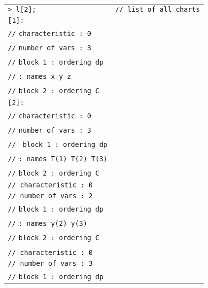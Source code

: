 \documentclass{article}
\begin{document}
\begin{table}[htbp]
	\begin{tabular}{ll}

		\texttt{> l[2];  } &   \texttt{// list of all charts} \\
		\texttt{[1]:}  &   \\
		\texttt{//}   \texttt{characteristic : 0}  &   \\
		\texttt{//}    \texttt{number of vars : 3}  &   \\
		\texttt{//}    \hspace*{1.2cm}   \texttt{block   1 : ordering dp}  &   \\
		\texttt{//}      \hspace*{2.7cm}   \texttt{: names    x y z}  &   \\
		\texttt{//}      \hspace*{1.2cm}    \texttt{block   2 : ordering C}  &   \\
		\texttt{[2]:}  &   \\
		\texttt{//}    \texttt{characteristic : 0}  &   \\
		\texttt{//}    \texttt{number of vars : 3}  &   \\
		\texttt{//}     \hspace*{1cm}    \texttt{ block   1 : ordering dp}  &   \\
		\texttt{//}      \hspace*{2.7cm} \texttt{: names    T(1) T(2) T(3)}  &   \\
		\texttt{//}    \hspace*{1.2cm}      \texttt{block   2 : ordering C}  &   \\
		\texttt{// characteristic : 0}         &  \\
		\texttt{// number of vars : 2}  &   \\
		\texttt{//} \hspace*{1.2cm} \texttt{block   1 : ordering dp}  &   \\
		\texttt{//} \hspace*{2.7cm}  \texttt{: names    y(2) y(3)}  &   \\
		\texttt{//}  \hspace*{1.2cm}      \texttt{block   2 : ordering C} &   \\ \\
		\texttt{// characteristic : 0}         &  \\
		\texttt{// number of vars : 3}  &   \\
		\texttt{//} \hspace*{1.2cm} \texttt{block   1 : ordering dp}  &   \\

\end{tabular}
\end{table}
\end{document}
